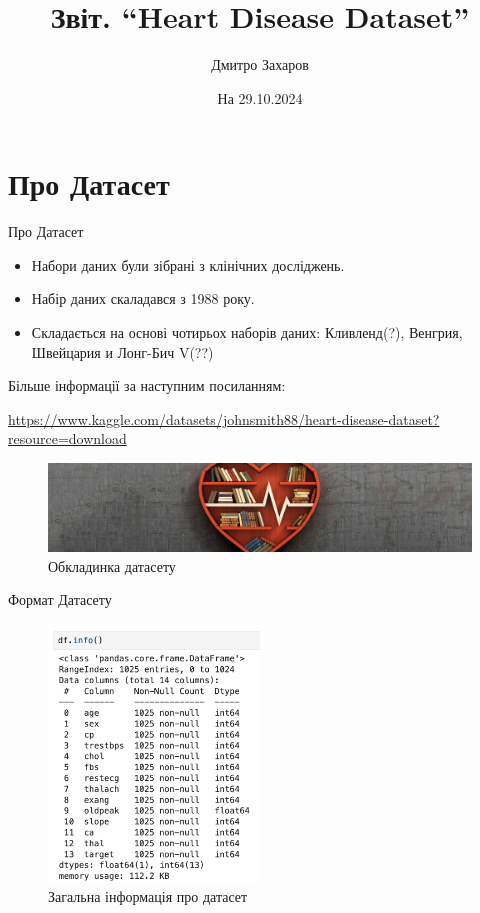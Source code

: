 \documentclass{beamer}
\title[Elliptic Curves]{\textbf{Звіт. ``Heart Disease Dataset''}}
\author{Дмитро Захаров}
\date{На 29.10.2024}
\begin{document}
	\frame {
		\titlepage
	}
  
    \section{Про Датасет}
    \begin{frame}{Про Датасет}
        \begin{itemize}
            \item Набори даних були зібрані з клінічних досліджень.
            \item Набір даних скаладався з 1988 року.
            \item Складається на основі чотирьох наборів даних: Кливленд(?), Венгрия, Швейцария и Лонг-Бич V(??)
        \end{itemize}

        Більше інформації за наступним посиланням:
        \begin{center}
            \url{https://www.kaggle.com/datasets/johnsmith88/heart-disease-dataset?resource=download}
        \end{center}

        \begin{figure}
            \centering
            \includegraphics[width=\textwidth]{images/heart-dataset-cover.jpg}
            \caption{Обкладинка датасету}
        \end{figure}
    \end{frame}

    \begin{frame}{Формат Датасету}
        \begin{figure}
            \centering
            \includegraphics[width=0.5\textwidth]{images/df-info.png}
            \caption{Загальна інформація про датасет}
        \end{figure}
    \end{frame}
\end{document}
